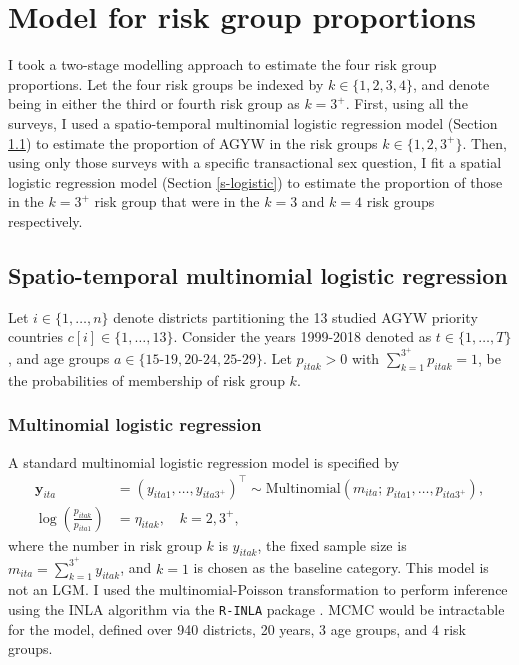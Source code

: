 \documentclass[a4paper, nobind]{templates/ociamthesis}
\begin{document}
\hypertarget{model-for-risk-group-proportions}{%
\section{Model for risk group proportions}\label{model-for-risk-group-proportions}}

I took a two-stage modelling approach to estimate the four risk group proportions.
Let the four risk groups be indexed by \(k \in \{1, 2, 3, 4\}\), and denote being in either the third or fourth risk group as \(k = 3^{+}\).
First, using all the surveys, I used a spatio-temporal multinomial logistic regression model (Section \ref{st-multinomial}) to estimate the proportion of AGYW in the risk groups \(k \in \{1, 2, 3^{+}\}\).
Then, using only those surveys with a specific transactional sex question, I fit a spatial logistic regression model (Section \ref{s-logistic}) to estimate the proportion of those in the \(k = 3^{+}\) risk group that were in the \(k = 3\) and \(k = 4\) risk groups respectively.

\hypertarget{st-multinomial}{%
\subsection{Spatio-temporal multinomial logistic regression}\label{st-multinomial}}

Let \(i \in \{1, \ldots, n\}\) denote districts partitioning the 13 studied AGYW priority countries \(c[i] \in \{1, \ldots, 13\}\).
Consider the years 1999-2018 denoted as \(t \in \{1, \ldots, T\}\), and age groups \(a \in \{\text{15-19}, \text{20-24}, \text{25-29}\}\).
Let \(p_{itak} > 0\) with \(\sum_{k = 1}^{3^{+}} p_{itak} = 1\), be the probabilities of membership of risk group \(k\).

\hypertarget{multinomial-logistic-regression}{%
\subsubsection{Multinomial logistic regression}\label{multinomial-logistic-regression}}

A standard multinomial logistic regression model \autocite[e.g.][]{gelman2013bayesian} is specified by
\begin{align}
    \mathbf{y}_{ita} &= (y_{ita1}, \ldots, y_{ita3^{+}})^\top \sim \text{Multinomial}(m_{ita}; \, p_{ita1}, \ldots, p_{ita3^{+}}), \\
    \log \left( \frac{p_{itak}}{p_{ita1}} \right) &= \eta_{itak}, \quad k = 2, 3^{+},
\end{align}
where the number in risk group \(k\) is \(y_{itak}\), the fixed sample size is \(m_{ita} = \sum_{k = 1}^{3^{+}} y_{itak}\), and \(k = 1\) is chosen as the baseline category.
This model is not an LGM.
I used the multinomial-Poisson transformation to perform inference using the INLA \autocite{rue2009approximate} algorithm via the \texttt{R-INLA} package \autocite{martins2013bayesian}.
MCMC would be intractable for the model, defined over 940 districts, 20 years, 3 age groups, and 4 risk groups.
\end{document}
